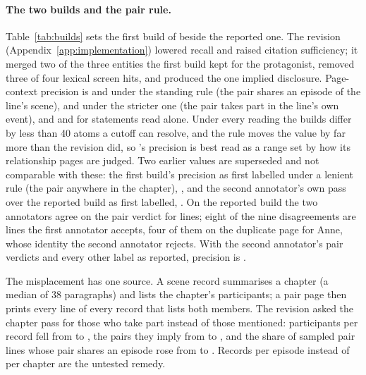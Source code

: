 \paragraph{The two builds and the pair rule.}
Table~\ref{tab:builds} sets the first build of \sys beside the reported one. The revision
(Appendix~\ref{app:implementation}) lowered recall and raised citation sufficiency; it
merged two of the three entities the first build kept for the protagonist, removed three of
four lexical screen hits, and produced the one implied disclosure. Page-context precision is  and
 under the standing rule (the pair shares an episode of the line's
scene),  and  under the stricter one (the pair takes part in
the line's own event), and  and  for statements read alone.
Under every reading the builds differ by less than 40 atoms a cutoff can resolve, and the
rule moves the value by far more than the revision did, so \sys's precision is best read as
a range set by how its relationship pages are judged. Two earlier values are superseded and
not comparable with these: the first build's precision as first labelled under a lenient
rule (the pair anywhere in the chapter), , and the second
annotator's own pass over the reported build as first labelled, . On
the reported build the two annotators agree on the pair verdict for 
lines; eight of the nine disagreements are lines the first annotator accepts, four of them
on the duplicate page for Anne, whose identity the second annotator rejects. With the second
annotator's pair verdicts and every other label as reported, precision is
.

The misplacement has one source. A scene record summarises a chapter (a median of 38
paragraphs) and lists the chapter's participants; a pair page then prints every line of
every record that lists both members. The revision asked the chapter pass for those who take
part instead of those mentioned: participants per record fell from  to
, the pairs they imply from  to , and the
share of sampled pair lines whose pair shares an episode rose from  to
. Records per episode instead of per chapter are the untested remedy.

